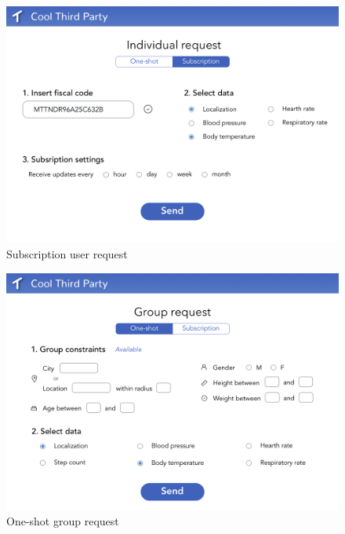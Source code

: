 \begin{figure}[H]
    \centering
    \includegraphics[scale=0.25]{Pictures/Mockup/web/individual2.png}
    \caption{Subscription user request}
\end{figure}
\begin{figure}[H]
    \centering
    \includegraphics[scale=0.25]{rasdL/Pictures/Mockup/web/group1.png}
    \caption{One-shot group request}
\end{figure}
